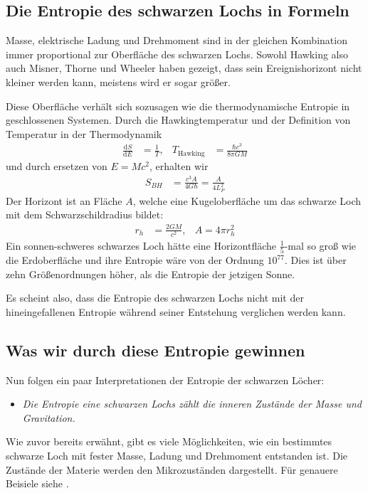 \documentclass[ngerman]{scrartcl}
\newcommand{\diff}{\mathrm{d}}
\begin{document}
	\subsection*{Die Entropie des schwarzen Lochs in Formeln}
	Masse, elektrische Ladung und Drehmoment sind in der gleichen Kombination immer proportional zur Oberfläche des schwarzen Lochs. Sowohl Hawking also auch Misner, Thorne und Wheeler haben gezeigt, dass sein Ereignishorizont nicht kleiner werden kann, meistens wird er sogar größer.
	
	Diese Oberfläche verhält sich sozusagen wie die thermodynamische Entropie in geschlossenen Systemen. 
	Durch die Hawkingtemperatur \cite{ParticleCreation} und der Definition von Temperatur in der Thermodynamik
		\begin{align}
			\frac{\diff S}{\diff E} &= \frac{1}{T},&
			T_{\text{Hawking}} &= \frac{\hbar c^3}{8 \pi G M}
		\end{align}
	und durch ersetzen von $E = Mc^2$, erhalten wir
		\begin{align} \label{SHentropie}
			S_{BH} &= \frac{c^3 A}{4 G \hbar} = \frac{A}{4 L_P^2} 
		\end{align}
	Der Horizont ist an Fläche $A$, welche eine Kugeloberfläche um das schwarze Loch mit dem Schwarzschildradius bildet:
		\begin{align}
			r_h &= \frac{2 GM}{c^2} ,& A = 4 \pi r_h^2 
		\end{align}
	Ein sonnen-schweres schwarzes Loch hätte eine Horizontfläche $\frac{1}{5}$-mal so groß wie die Erdoberfläche und ihre Entropie wäre von der Ordnung $10^{77}$. Dies ist über zehn Größenordnungen höher, als die Entropie der jetzigen Sonne.  
	
	Es scheint also, dass die Entropie des schwarzen Lochs nicht mit der hineingefallenen Entropie während seiner Entstehung verglichen werden kann.
	
	\subsection*{Was wir durch diese Entropie gewinnen}
	Nun folgen ein paar Interpretationen der Entropie der schwarzen Löcher:
	
	\begin{itemize}
		\item [~] \textit{Die Entropie eine schwarzen Lochs zählt die inneren Zustände der Masse und Gravitation.}
	\end{itemize}
	Wie zuvor bereits erwähnt, gibt es viele Möglichkeiten, wie ein bestimmtes schwarze Loch mit fester Masse, Ladung und Drehmoment entstanden ist. Die Zustände der Materie werden den Mikrozuständen dargestellt. Für genauere Beisiele siehe \cite{FrolovNovikov}.
	
\end{document}

